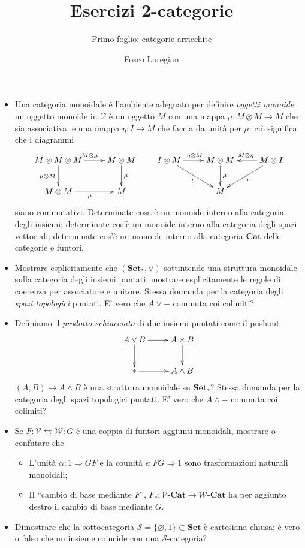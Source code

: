 \documentclass{amsart}
\title{Esercizi 2-categorie}
\subtitle{Primo foglio: categorie arricchite}
\author{Fosco Loregian}
\def\V{\mathcal{V}}
\def\VCat{\V\text{-}\mathbf{Cat}}
\def\Cat{\mathbf{Cat}}
\begin{document}
\maketitle
\begin{itemize}
	\item Una categoria monoidale è l'ambiente adeguato per definire \emph{oggetti monoide}: un oggetto monoide in $\V$ è un oggetto $M$ con una mappa $\mu : M\otimes M\to M$ che sia associativa, e una mappa $\eta : I\to M$ che faccia da unità per $\mu$: ciò significa che i diagrammi
	\[\xymatrix{
	M\otimes M\otimes M \ar[r]^{M\otimes\mu}\ar[d]_{\mu\otimes M}& M\otimes M \ar[d]^\mu\\
	M\otimes M \ar[r]_\mu & M
	}\qquad 
	\xymatrix{
	I\otimes M\ar[dr]_l \ar[r]^{\eta\otimes M}& M\otimes M \ar[d]^\mu & M\otimes I \ar[l]_{M\otimes \eta}\ar[dl]^r \\
	& M &
	}\] siano commutativi. Determinate cosa è un monoide interno alla categoria degli insiemi; determinate cos'è un monoide interno alla categoria degli spazi vettoriali; determinate cos'è un monoide interno alla categoria $\Cat$ delle categorie e funtori.
	\item Mostrare esplicitamente che $(\mathbf{Set}_*,\lor)$ sottintende una struttura monoidale sulla categoria degli insiemi puntati; mostrare esplicitamente le regole di coerenza per associatore e unitore. Stessa domanda per la categoria degli \emph{spazi topologici} puntati. E' vero che $A\lor -$ commuta coi colimiti?
	\item Definiamo il \emph{prodotto schiacciato} di due insiemi puntati come il pushout
	\[\xymatrix{A\lor B \ar[r]\ar[d]& A\times B\ar[d] \\ {*}\ar[r] & A\land B}\]
	$(A,B)\mapsto A\land B$ è una struttura monoidale su $\mathbf{Set}_*$? Stessa domanda per la categoria degli spazi topologici puntati. E' vero che $A\land -$ commuta coi colimiti?
	\item Se $F : \V \leftrightarrows \mathcal{W} : G$ è una coppia di funtori aggiunti monoidali, mostrare o confutare che
	\begin{itemize}
		\item L'unità $\alpha : 1\Rightarrow GF$ e la counità $\epsilon : FG \Rightarrow 1$ sono trasformazioni naturali monoidali;
		\item Il ``cambio di base mediante $F$'', $F_* : \VCat \to \mathcal{W}\text{-}\Cat$ ha per aggiunto destro il cambio di base mediante $G$.
	\end{itemize}
	\item Dimostrare che la sottocategoria $\mathcal S = \{\varnothing, 1\}\subset\mathbf{Set}$ è cartesiana chiusa; è vero o falso che un insieme coincide con una $\mathcal S$-categoria?

\end{itemize}
\end{document}
